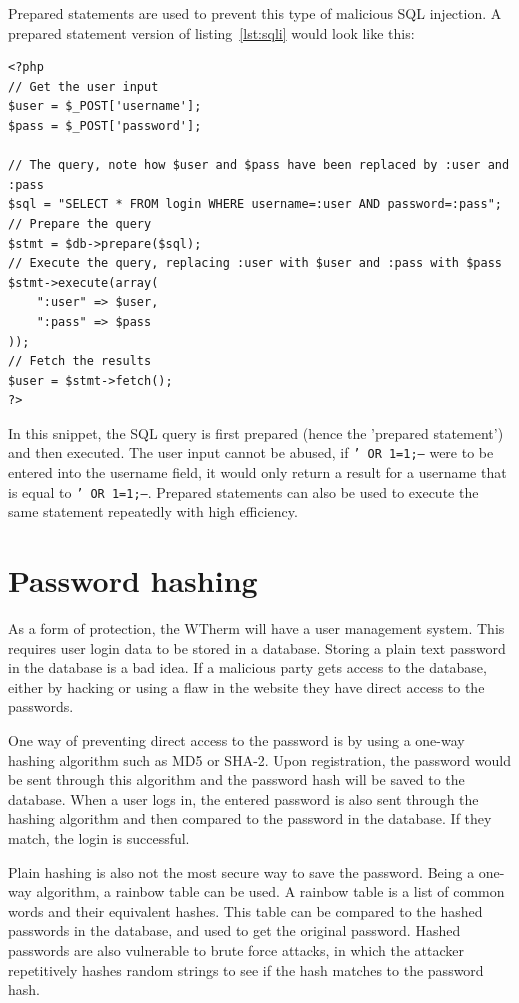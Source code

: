 \documentclass[12pt,a4paper,final]{report}
\begin{document}
Prepared statements are used to prevent this type of malicious SQL injection. A prepared statement version of listing~\ref{lst:sqli} would look like this:
\lstset{language=PHP}
\begin{lstlisting}[caption={Safe PHP MySQL login code},label={lst:sqlipdo}]
<?php
// Get the user input
$user = $_POST['username'];
$pass = $_POST['password'];

// The query, note how $user and $pass have been replaced by :user and :pass
$sql = "SELECT * FROM login WHERE username=:user AND password=:pass";
// Prepare the query
$stmt = $db->prepare($sql);
// Execute the query, replacing :user with $user and :pass with $pass
$stmt->execute(array(
	":user" => $user,
	":pass" => $pass
));
// Fetch the results
$user = $stmt->fetch();
?>
\end{lstlisting}
In this snippet, the SQL query is first prepared (hence the 'prepared statement') and then executed. The user input cannot be abused, if \texttt{' OR 1=1;--} were to be entered into the username field, it would only return a result for a username that is equal to \texttt{' OR 1=1;--}. Prepared statements can also be used to execute the same statement repeatedly with high efficiency.

\chapter{Password hashing} \label{chap:passwordHashing}
As a form of protection, the WTherm will have a user management system. This requires user login data to be stored in a database. Storing a plain text password in the database is a bad idea. If a malicious party gets access to the database, either by hacking or using a flaw in the website they have direct access to the passwords.

One way of preventing direct access to the password is by using a one-way hashing algorithm such as MD5 or SHA-2. Upon registration, the password would be sent through this algorithm and the password hash will be saved to the database. When a user logs in, the entered password is also sent through the hashing algorithm and then compared to the password in the database. If they match, the login is successful.

Plain hashing is also not the most secure way to save the password. Being a one-way algorithm, a rainbow table can be used. A rainbow table is a list of common words and their equivalent hashes. This table can be compared to the hashed passwords in the database, and used to get the original password. Hashed passwords are also vulnerable to brute force attacks, in which the attacker repetitively hashes random strings to see if the hash matches to the password hash.
\end{document}
